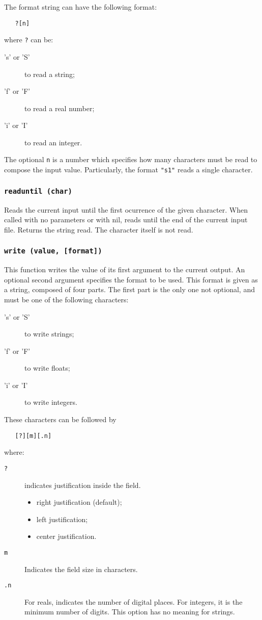 The format string can have the following format:
\begin{verbatim}
   ?[n]
\end{verbatim}
where \verb'?' can be:
\begin{description}
\item['s' or 'S'] to read a string;
\item['f' or 'F'] to read a real number;
\item['i' or 'I'] to read an integer.
\end{description}
The optional \verb'n' is a number which specifies how many characters
must be read to compose the input value.
Particularly, the format \verb'"s1"' reads a single character.

\subsubsection*{{\tt readuntil (char)}}

Reads the current input until the first ocurrence of the given character.
When called with no parameters or with nil,
reads until the end of the current input file.
Returns the string read.
The character itself is not read.

\subsubsection*{{\tt write (value, [format])}}

This function writes the value of its first argument to the current output.
An optional second argument specifies the format to be used.
This format is given as a string, composed of four parts.
The first part is the only one not optional, and must be one of the
following characters:
\begin{description}
\item['s' or 'S'] to write strings;
\item['f' or 'F'] to write floats;
\item['i' or 'I'] to write integers.
\end{description}
These characters can be followed by
\begin{verbatim}
   [?][m][.n]
\end{verbatim}
where:
\begin{description}
\item[\verb'?'] indicates justification inside the field.
\begin{itemize}
\item['\verb'<''] right justification (default);
\item['\verb'>''] left justification;
\item['\verb'|''] center justification.
\end{itemize}
\item[\verb'm'] Indicates the field size in characters.
\item[\verb'.n'] For reals, indicates the number of digital places.
For integers, it is the minimum number of digits.
This option has no meaning for strings.
\end{description}

